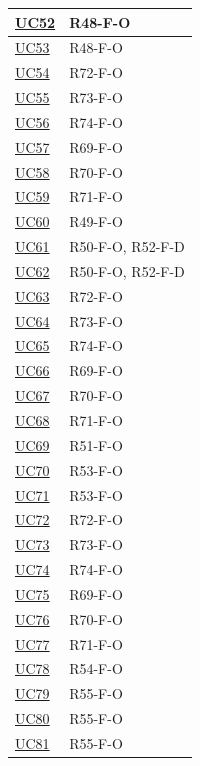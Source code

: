 \begin{longtable}{|p{2.8cm}|p{10.2cm}|}
	\hyperlink{uc52}{UC52}   & R48-F-O \\ \hline
	\hyperlink{uc53}{UC53}   & R48-F-O \\ \hline
	\hyperlink{uc54}{UC54}   & R72-F-O \\ \hline
	\hyperlink{uc55}{UC55}   & R73-F-O \\ \hline
	\hyperlink{uc56}{UC56}   & R74-F-O \\ \hline
	\hyperlink{uc57}{UC57}   & R69-F-O \\ \hline
	\hyperlink{uc58}{UC58}   & R70-F-O \\ \hline
	\hyperlink{uc59}{UC59}   & R71-F-O \\ \hline
	\hyperlink{uc60}{UC60}   & R49-F-O \\ \hline
	\hyperlink{uc61}{UC61}   & R50-F-O, R52-F-D \\ \hline
	\hyperlink{uc62}{UC62}   & R50-F-O, R52-F-D \\ \hline
	\hyperlink{uc63}{UC63}   & R72-F-O \\ \hline
	\hyperlink{uc64}{UC64}   & R73-F-O \\ \hline
	\hyperlink{uc65}{UC65}   & R74-F-O \\ \hline
	\hyperlink{uc66}{UC66}   & R69-F-O \\ \hline
	\hyperlink{uc67}{UC67}   & R70-F-O \\ \hline
	\hyperlink{uc68}{UC68}   & R71-F-O \\ \hline
	\hyperlink{uc69}{UC69}   & R51-F-O \\ \hline
	\hyperlink{uc70}{UC70}   & R53-F-O \\ \hline
	\hyperlink{uc71}{UC71}   & R53-F-O \\ \hline
	\hyperlink{uc72}{UC72}   & R72-F-O \\ \hline
	\hyperlink{uc73}{UC73}   & R73-F-O \\ \hline
	\hyperlink{uc74}{UC74}   & R74-F-O \\ \hline
	\hyperlink{uc75}{UC75}   & R69-F-O \\ \hline
	\hyperlink{uc76}{UC76}   & R70-F-O \\ \hline
	\hyperlink{uc77}{UC77}   & R71-F-O \\ \hline
	\hyperlink{uc78}{UC78}   & R54-F-O \\ \hline
	\hyperlink{uc79}{UC79}   & R55-F-O \\ \hline
	\hyperlink{uc80}{UC80}   & R55-F-O \\ \hline
	\hyperlink{uc81}{UC81}   & R55-F-O \\ \hline

\end{longtable}
